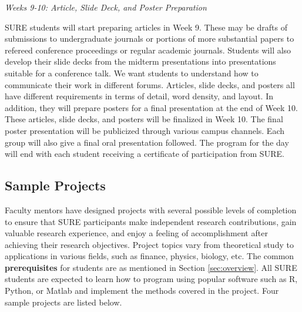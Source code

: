 \documentclass[11pt]{NSFamsart}
\newcommand{\FJHNote}[1]{{\color{blue}Fred: #1}}
\begin{document}
\centerline{\emph{Weeks 9-10: Article, Slide Deck, and Poster Preparation}} 

SURE students will start preparing articles in Week 9. These may be drafts of submissions to undergraduate journals or portions of more substantial papers to refereed conference proceedings or regular academic journals. Students will also develop their slide decks from the midterm presentations into presentations suitable for a conference talk. We want students to understand how to communicate their work in different forums.  Articles, slide decks, and posters all have different requirements in terms of detail, word density, and layout. In addition, they will prepare posters for a final presentation at the end of Week 10.  These articles, slide decks, and posters will be finalized in Week 10. The final poster presentation will be publicized through various campus channels. Each group will also give a final oral presentation followed.  The program for the day will end with each student receiving a certificate of participation from SURE. %



\subsection{Sample Projects }
Faculty mentors have designed projects with several possible levels of completion to ensure that SURE participants make independent research contributions, gain valuable research experience, and enjoy a feeling of accomplishment after achieving their research objectives. Project topics vary from theoretical study to applications in various fields, such as finance, physics, biology, etc. The common \textbf{prerequisites} for students are as mentioned in Section \ref{sec:overview}. All SURE students are expected to learn how to program using popular software such as R, Python, or Matlab and implement the methods covered in the project. Four sample projects are listed below.




%
\end{document}
